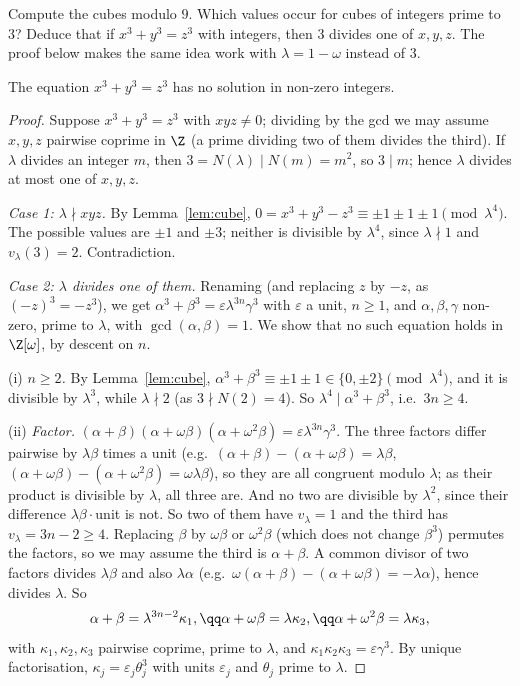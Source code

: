 \begin{think}
Compute the cubes modulo $9$. Which values occur for cubes of integers prime to $3$? Deduce that if $x^3+y^3=z^3$ with integers, then $3$ divides one of $x,y,z$. The proof below makes the same idea work with $\lambda=1-\omega$ instead of $3$.
\end{think}

\begin{theorem}\label{thm:flt3}
The equation $x^3+y^3=z^3$ has no solution in non-zero integers.
\end{theorem}
\begin{proof}
Suppose $x^3+y^3=z^3$ with $xyz\ne0$; dividing by the gcd we may assume $x,y,z$ pairwise coprime in $\Z$ (a prime dividing two of them divides the third). If $\lambda$ divides an integer $m$, then $3=N(\lambda)\mid N(m)=m^2$, so $3\mid m$; hence $\lambda$ divides at most one of $x,y,z$.

\emph{Case 1: $\lambda\nmid xyz$.} By Lemma~\ref{lem:cube}, $0=x^3+y^3-z^3\equiv\pm1\pm1\pm1\pmod{\lambda^4}$. The possible values are $\pm1$ and $\pm3$; neither is divisible by $\lambda^4$, since $\lambda\nmid1$ and $v_\lambda(3)=2$. Contradiction.

\emph{Case 2: $\lambda$ divides one of them.} Renaming (and replacing $z$ by $-z$, as $(-z)^3=-z^3$), we get $\alpha^3+\beta^3=\varepsilon\lambda^{3n}\gamma^3$ with $\varepsilon$ a unit, $n\ge1$, and $\alpha,\beta,\gamma$ non-zero, prime to $\lambda$, with $\gcd(\alpha,\beta)=1$. We show that no such equation holds in $\Z[\omega]$, by descent on $n$.

(i) \emph{$n\ge2$.} By Lemma~\ref{lem:cube}, $\alpha^3+\beta^3\equiv\pm1\pm1\in\{0,\pm2\}\pmod{\lambda^4}$, and it is divisible by $\lambda^3$, while $\lambda\nmid2$ (as $3\nmid N(2)=4$). So $\lambda^4\mid\alpha^3+\beta^3$, i.e.\ $3n\ge4$.

(ii) \emph{Factor.} $(\alpha+\beta)(\alpha+\omega\beta)(\alpha+\omega^2\beta)=\varepsilon\lambda^{3n}\gamma^3$. The three factors differ pairwise by $\lambda\beta$ times a unit (e.g.\ $(\alpha+\beta)-(\alpha+\omega\beta)=\lambda\beta$, $(\alpha+\omega\beta)-(\alpha+\omega^2\beta)=\omega\lambda\beta$), so they are all congruent modulo $\lambda$; as their product is divisible by $\lambda$, all three are. And no two are divisible by $\lambda^2$, since their difference $\lambda\beta\cdot$unit is not. So two of them have $v_\lambda=1$ and the third has $v_\lambda=3n-2\ge4$. Replacing $\beta$ by $\omega\beta$ or $\omega^2\beta$ (which does not change $\beta^3$) permutes the factors, so we may assume the third is $\alpha+\beta$. A common divisor of two factors divides $\lambda\beta$ and also $\lambda\alpha$ (e.g.\ $\omega(\alpha+\beta)-(\alpha+\omega\beta)=-\lambda\alpha$), hence divides $\lambda$. So
\[
\begin{gathered}\alpha+\beta=\lambda^{3n-2}\kappa_1,\qq\alpha+\omega\beta=\lambda\kappa_2,\qq\alpha+\omega^2\beta=\lambda\kappa_3,\end{gathered}
\]
with $\kappa_1,\kappa_2,\kappa_3$ pairwise coprime, prime to $\lambda$, and $\kappa_1\kappa_2\kappa_3=\varepsilon\gamma^3$. By unique factorisation, $\kappa_j=\varepsilon_j\theta_j^3$ with units $\varepsilon_j$ and $\theta_j$ prime to $\lambda$.


\end{proof}
